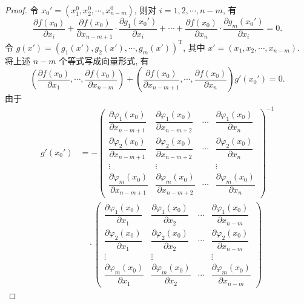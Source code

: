 \documentclass[UTF8,12pt,a4paper,fontset=fandol]{ctexart}
\begin{document}
\begin{proof}
令 $x_0'=(x_1^0,x_2^0,\cdots,x_{n-m}^0)$, 则对 $i=1,2,\cdots,n-m$, 有
\[
  \frac{\partial f(x_0)}{\partial x_i}
  +\frac{\partial f(x_0)}{\partial x_{n-m+1}}\cdot
  \frac{\partial g_1(x_0')}{\partial x_i}
  +\cdots+
  \frac{\partial f(x_0)}{\partial x_n}\cdot
  \frac{\partial g_m(x_0')}{\partial x_i}
  =0.
\]
令 $g(x')=(g_1(x'),g_2(x'),\cdots,g_m(x'))^{\mathrm T}$, 其中 $x'=(x_1,x_2,\cdots,x_{n-m})$. 将上述 $n-m$ 个等式写成向量形式, 有
\begin{equation}
  \left(
    \frac{\partial f(x_0)}{\partial x_1},
    \cdots,
    \frac{\partial f(x_0)}{\partial x_{n-m}}
  \right)
  +
  \left(
    \frac{\partial f(x_0)}{\partial x_{n-m+1}},
    \cdots,
    \frac{\partial f(x_0)}{\partial x_n}
  \right)
  g'(x_0')=0.
  \label{course-eq-14-5-4}
\end{equation}
由于
\begin{equation}
\begin{aligned}
  g'(x_0')
  &=
  -
  \begin{pmatrix}
    \dfrac{\partial\varphi_1(x_0)}{\partial x_{n-m+1}} &
    \dfrac{\partial\varphi_1(x_0)}{\partial x_{n-m+2}} &
    \cdots &
    \dfrac{\partial\varphi_1(x_0)}{\partial x_n}\\
    \dfrac{\partial\varphi_2(x_0)}{\partial x_{n-m+1}} &
    \dfrac{\partial\varphi_2(x_0)}{\partial x_{n-m+2}} &
    \cdots &
    \dfrac{\partial\varphi_2(x_0)}{\partial x_n}\\
    \vdots & \vdots & & \vdots\\
    \dfrac{\partial\varphi_m(x_0)}{\partial x_{n-m+1}} &
    \dfrac{\partial\varphi_m(x_0)}{\partial x_{n-m+2}} &
    \cdots &
    \dfrac{\partial\varphi_m(x_0)}{\partial x_n}
  \end{pmatrix}^{-1}\\
  &\quad\cdot
  \begin{pmatrix}
    \dfrac{\partial\varphi_1(x_0)}{\partial x_1} &
    \dfrac{\partial\varphi_1(x_0)}{\partial x_2} &
    \cdots &
    \dfrac{\partial\varphi_1(x_0)}{\partial x_{n-m}}\\
    \dfrac{\partial\varphi_2(x_0)}{\partial x_1} &
    \dfrac{\partial\varphi_2(x_0)}{\partial x_2} &
    \cdots &
    \dfrac{\partial\varphi_2(x_0)}{\partial x_{n-m}}\\
    \vdots & \vdots & & \vdots\\
    \dfrac{\partial\varphi_m(x_0)}{\partial x_1} &
    \dfrac{\partial\varphi_m(x_0)}{\partial x_2} &
    \cdots &
    \dfrac{\partial\varphi_m(x_0)}{\partial x_{n-m}}
  \end{pmatrix}

\end{aligned}
\end{equation}
\end{proof}
\end{document}
